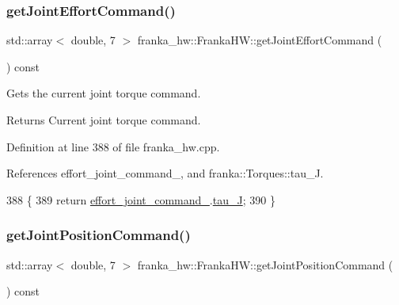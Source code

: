\subsubsection{\texorpdfstring{get\+Joint\+Effort\+Command()}{getJointEffortCommand()}}
{\footnotesize\ttfamily std\+::array$<$ double, 7 $>$ franka\+\_\+hw\+::\+Franka\+H\+W\+::get\+Joint\+Effort\+Command (\begin{DoxyParamCaption}{ }\end{DoxyParamCaption}) const\hspace{0.3cm}{\ttfamily [noexcept]}}

Gets the current joint torque command.

\begin{DoxyReturn}{Returns}
Current joint torque command. 
\end{DoxyReturn}


Definition at line 388 of file franka\+\_\+hw.\+cpp.



References effort\+\_\+joint\+\_\+command\+\_\+, and franka\+::\+Torques\+::tau\+\_\+J.


\begin{DoxyCode}
388                                                                    \{
389   \textcolor{keywordflow}{return} \hyperlink{classfranka__hw_1_1FrankaHW_a718469d0646cacde1bd8ad1b798a528c}{effort\_joint\_command\_}.\hyperlink{classfranka_1_1Torques_ac2a266cc2d3b7e0fb4f8eff045dbaed8}{tau\_J};
390 \}
\end{DoxyCode}
\mbox{\label{classfranka__hw_1_1FrankaHW_a80bc3da19575532ab827bc9c62f91bed}} 
\subsubsection{\texorpdfstring{get\+Joint\+Position\+Command()}{getJointPositionCommand()}}
{\footnotesize\ttfamily std\+::array$<$ double, 7 $>$ franka\+\_\+hw\+::\+Franka\+H\+W\+::get\+Joint\+Position\+Command (\begin{DoxyParamCaption}{ }\end{DoxyParamCaption}) const\hspace{0.3cm}{\ttfamily [noexcept]}}

